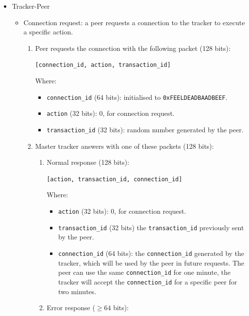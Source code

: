 \documentclass[twoside,a4paper,10pt]{article}
\begin{document}
\begin{itemize}
\begin{enumerate}
  \end{enumerate}
\item Tracker-Peer
  \begin{itemize}
  \item Connection request: a peer requests a
    connection to the tracker to execute a specific action.

    \begin{enumerate}
    \item Peer requests the connection with the following packet (128 bits):

      \texttt{[connection\_id, action, transaction\_id]}
      
      Where:
      \begin{itemize}
      \item \texttt{connection\_id} (64 bits): initialised to
        \texttt{0xFEELDEADBAADBEEF}.
      \item \texttt{action} (32 bits): 0, for connection request.
      \item \texttt{transaction\_id} (32 bits): random number generated by the
        peer.
      \end{itemize}
    \item Master tracker answers with one of these packets (128 bits):
      \begin{enumerate}  

      \item Normal response (128 bits):
        
        \texttt{[action, transaction\_id, connection\_id]}

        Where:  
        \begin{itemize}
        \item \texttt{action} (32 bits): 0, for connection request.
        \item \texttt{transaction\_id} (32 bits)
          the \texttt{transaction\_id} previously sent by the peer.
        \item \texttt{connection\_id} (64 bits):
          the \texttt{connection\_id} generated by the tracker, which will be
          used by the peer in future requests. The peer can use the same
          \texttt{connection\_id} for one minute, the tracker will accept the
          \texttt{connection\_id} for a specific peer for two minutes.
        \end{itemize}

      \item Error response ($\geq64$ bits)\label{it:error-response}:
        

\end{enumerate}
\end{enumerate}
\end{itemize}
\end{itemize}
\end{document}
